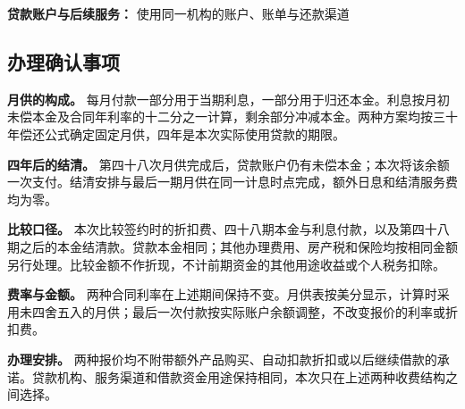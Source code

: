 \documentclass[UTF8,fontset=none,11pt,a4paper]{ctexart}
\begin{document}
\textbf{贷款账户与后续服务：} 使用同一机构的账户、账单与还款渠道


\subsection*{办理确认事项}
\textbf{月供的构成。} 每月付款一部分用于当期利息，一部分用于归还本金。利息按月初未偿本金及合同年利率的十二分之一计算，剩余部分冲减本金。两种方案均按三十年偿还公式确定固定月供，四年是本次实际使用贷款的期限。


\textbf{四年后的结清。} 第四十八次月供完成后，贷款账户仍有未偿本金；本次将该余额一次支付。结清安排与最后一期月供在同一计息时点完成，额外日息和结清服务费均为零。


\textbf{比较口径。} 本次比较签约时的折扣费、四十八期本金与利息付款，以及第四十八期之后的本金结清款。贷款本金相同；其他办理费用、房产税和保险均按相同金额另行处理。比较金额不作折现，不计前期资金的其他用途收益或个人税务扣除。


\textbf{费率与金额。} 两种合同利率在上述期间保持不变。月供表按美分显示，计算时采用未四舍五入的月供；最后一次付款按实际账户余额调整，不改变报价的利率或折扣费。


\textbf{办理安排。} 两种报价均不附带额外产品购买、自动扣款折扣或以后继续借款的承诺。贷款机构、服务渠道和借款资金用途保持相同，本次只在上述两种收费结构之间选择。
\end{document}

